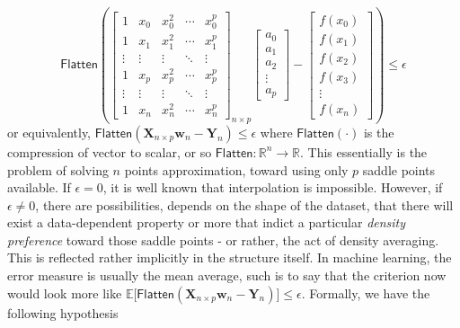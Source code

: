 \documentclass[
  journal=largetwo,
  year=2025,
  volume=37,
]{cup-journal}
\begin{document}
\begin{equation}\label{eq:soft_hard_interpolation_role}
\mathsf{Flatten}\left(\begin{bmatrix}
1 & x_0 & x_0^2 & \cdots & x_0^p \\
1 & x_1 & x_1^2 & \cdots & x_1^p \\
\vdots & \vdots & \vdots & \ddots & \vdots \\
1 & x_p & x_p^2 & \cdots & x_p^p \\
\vdots & \vdots & \vdots & \ddots & \vdots \\
1 & x_n & x_n^2 & \cdots & x_n^p
\end{bmatrix}_{n\times p}
\begin{bmatrix}
a_0 \\
a_1 \\
a_2 \\
\vdots \\
a_p
\end{bmatrix}
- 
\begin{bmatrix}
f(x_0) \\
f(x_1) \\
f(x_2) \\
f(x_3) \\
\vdots \\
f(x_n)
\end{bmatrix}\right)
\leq \epsilon
\end{equation}
or equivalently, $\mathsf{Flatten}(\mathbf{X}_{n\times p}\mathbf{w}_{n}-\mathbf{Y}_{n})\leq \epsilon$ where $\mathsf{Flatten}(\cdot)$ is the compression of vector to scalar, or so $\mathsf{Flatten}: \mathbb{R}^{n}\to \mathbb{R}$. This essentially is the problem of solving $n$ points approximation, toward using only $p$ saddle points available. If $\epsilon =0$, it is well known that interpolation is impossible. However, if $\epsilon\ne 0$, there are possibilities, depends on the shape of the dataset, that there will exist a data-dependent property or more that indict a particular \textit{density preference} toward those saddle points - or rather, the act of density averaging. This is reflected rather implicitly in the structure itself. In machine learning, the error measure is usually the mean average, such is to say that the criterion now would look more like $\mathbb{E}\Big[\mathsf{Flatten}(\mathbf{X}_{n\times p}\mathbf{w}_{n}-\mathbf{Y}_{n})\Big]\leq \epsilon$. Formally, we have the following hypothesis
\end{document}
